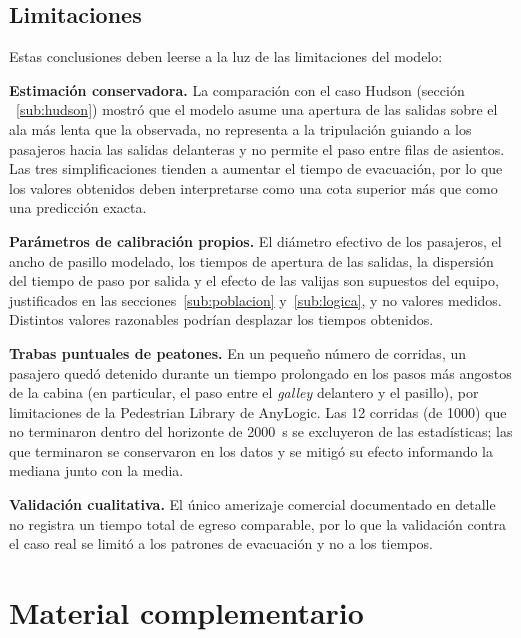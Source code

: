 \documentclass[a4paper, 11pt]{article}
\begin{document}
\subsection{Limitaciones}

Estas conclusiones deben leerse a la luz de las limitaciones del modelo:

\textbf{Estimaci\'on conservadora.} La comparaci\'on con el caso Hudson (secci\'on
~\ref{sub:hudson}) mostr\'o que el modelo asume una apertura de las salidas sobre el ala m\'as
lenta que la observada, no representa a la tripulaci\'on guiando a los pasajeros
hacia las salidas delanteras y no permite el paso entre filas de asientos. Las tres
simplificaciones tienden a aumentar el tiempo de evacuaci\'on, por lo que los valores
obtenidos deben interpretarse como una cota superior m\'as que como una predicci\'on
exacta.

\textbf{Par\'ametros de calibraci\'on propios.} El di\'ametro efectivo de los
pasajeros, el ancho de pasillo modelado, los tiempos de apertura de las salidas, la
dispersi\'on del tiempo de paso por salida y el efecto de las valijas son
supuestos del equipo, justificados en las secciones~\ref{sub:poblacion} y~\ref{sub:logica}, y no valores medidos.
Distintos valores razonables podr\'ian desplazar los tiempos obtenidos.

\textbf{Trabas puntuales de peatones.} En un peque\~no n\'umero de corridas, un
pasajero qued\'o detenido durante un tiempo prolongado en los pasos m\'as angostos de
la cabina (en particular, el paso entre el \textit{galley} delantero y el pasillo),
por limitaciones de la Pedestrian Library de AnyLogic. Las 12 corridas (de 1000) que no terminaron dentro del
horizonte de 2000~s se excluyeron de las estad\'isticas; las que terminaron se
conservaron en los datos y se mitig\'o su efecto informando la mediana junto con la
media.

\textbf{Validaci\'on cualitativa.} El \'unico amerizaje comercial documentado en
detalle no registra un tiempo total de egreso comparable, por lo que la validaci\'on
contra el caso real se limit\'o a los patrones de evacuaci\'on y no a los tiempos.

\newpage
\section{Material complementario}
\end{document}
